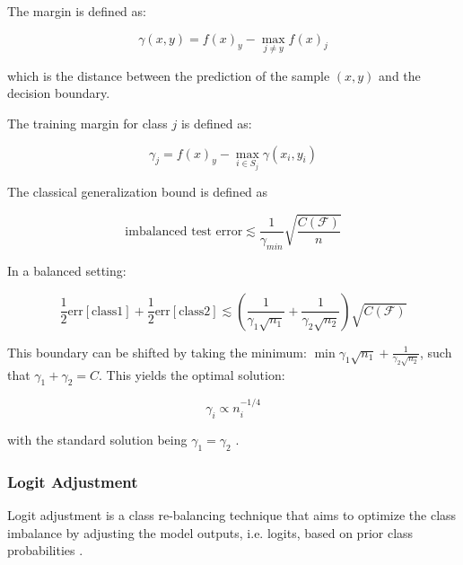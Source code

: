 The margin is defined as:

\begin{equation}
    \label{eq:margin_def}
    \gamma(x,y) = f(x)_y - \max_{j \neq y}f(x)_j
\end{equation}

which is the distance between the prediction of the sample $(x,y)$ and the decision boundary.

The training margin for class $j$ is defined as:

\begin{equation}
    \label{eq:margin_class_def}
    \gamma_j = f(x)_y - \max_{i \in S_j}\gamma(x_i,y_i)
\end{equation}

The classical generalization bound is defined as

\begin{equation}
    \label{eq:gen_bound}
    \text{imbalanced test error}\lesssim \frac{1}{\gamma_{min}}\sqrt{\frac{C(\mathcal{F})}{n}}
\end{equation}

In a balanced setting:

\begin{equation}
    \frac{1}{2}\text{err}[\text{class1}]+\frac{1}{2}\text{err}[\text{class2}] \lesssim \left(\frac{1}{\gamma_1\sqrt{n_1}}+\frac{1}{\gamma_2\sqrt{n_2}}\right)\sqrt{C(\mathcal{F})}
\end{equation}

This boundary can be shifted by taking the minimum: $\min{\gamma_1\sqrt{n_1}}+\frac{1}{\gamma_2\sqrt{n_2}}$, such that $\gamma_1+\gamma_2=C$. This yields the optimal solution:

\begin{equation}
    \label{eq:opt_margin}
    \gamma_i\varpropto n^{-1/4}_i 
\end{equation}

with the standard solution being $\gamma_1=\gamma_2$ \cite{cao2019learningimbalanceddatasetslabeldistributionaware}. 

\subsubsection{Logit Adjustment}
\label{sec:logit_adjustment}
Logit adjustment is a class re-balancing technique that aims to optimize the class imbalance by adjusting the model outputs, i.e. logits, based on prior class probabilities \cite{menon2021longtaillearninglogitadjustment,ren2020balancedmetasoftmaxlongtailedvisual}.  

